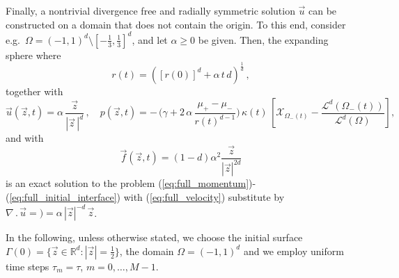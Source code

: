 \documentclass[a4paper,12pt,onecolumn]{article}
\newcommand{\R}{{\mathbb R}}
\newcommand{\bigchi}{\ensuremath{\mathrm{\mathcal{X}}}}
\newcommand{\charfcn}[1]{\bigchi_{#1}} %
\begin{document}
Finally, a nontrivial divergence free and radially symmetric
solution $\vec u$ can be constructed on a domain that does not contain the
origin. To this end, consider e.g.\ $\Omega = (-1,1)^d \setminus [-\frac13,
\frac13]^d$, and let $\alpha \geq 0$ be given. Then, the expanding sphere where
\begin{equation} \label{eq:r_benchmark3}
r(t) = ([r(0)]^d + \alpha\,t\,d)^\frac1d \,,
\end{equation}
together with
\begin{equation} \label{eq:up_benchmark3}
\vec u(\vec z, t) = \alpha\,\frac{\vec z}{|\vec z\,|^d}\,, \quad
p(\vec z, t) = -\,\bigg(\gamma +2\,\alpha\,\frac{\mu_+ - \mu_-}
{r(t)^{d-1}}\bigg)\,\kappa(t)\,\left[ \charfcn{\Omega_-(t)} -
\frac{\mathcal{L}^d(\Omega_-(t))}{\mathcal{L}^d(\Omega)}\right],
\end{equation}
and with
\begin{equation}
\vec f(\vec z, t) = (1-d)\alpha^2\frac{\vec z}{|\vec z|^{2d}}
\end{equation}
is an exact solution to the problem
(\ref{eq:full_momentum})-(\ref{eq:full_initial_interface}) with
(\ref{eq:full_velocity}) substitute by $\nabla\,.\,\vec u =) = \alpha\,|\vec
z|^{-d}\,\vec z$.

In the following, unless otherwise stated, we choose the initial surface
$\Gamma(0) = \{ \vec z \in \R^d : |\vec z| = \frac12 \}$, the domain
$\Omega = (-1,1)^d$ and we employ uniform time steps $\tau_m=\tau$,
$m=0,\ldots, M-1$.



\end{document}
